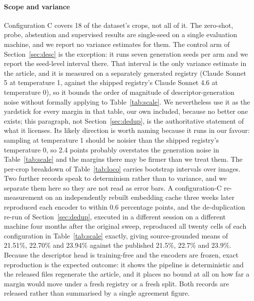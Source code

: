 \documentclass[a4paper,fleqn]{cas-dc}
\begin{document}
\paragraph{Scope and variance} Configuration C covers 18 of the dataset's crops, not all of it. %
The zero-shot, probe, abstention and supervised results are
single-seed on a single evaluation machine, and we report no variance estimates for them.
The control arm of Section~\ref{sec:desc} is the exception: it runs seven generation
seeds per arm and we report the seed-level interval there. That interval is the only variance estimate in the article, and it is measured on a separately generated registry (Claude Sonnet 5 at temperature 1, against the shipped registry's Claude Sonnet 4.6 at temperature 0), so it bounds the order of magnitude of descriptor-generation noise without formally applying to Table~\ref{tab:scale}. We nevertheless use it as the yardstick for every margin in that table, our own included, because no better one exists; this paragraph, not Section~\ref{sec:dedup}, is the authoritative statement of what it licenses. Its likely direction is worth naming because it runs in our favour: sampling at temperature 1 should be noisier than the shipped registry's temperature 0, so 2.4 points probably overstates the generation noise in Table~\ref{tab:scale} and the margins there may be firmer than we treat them. The per-crop breakdown of Table~\ref{tab:loco} carries bootstrap intervals over images. Two further records speak to determinism rather than to variance, and we separate them here so they are not read as error bars. A configuration-C re-measurement on an independently rebuilt embedding cache three weeks later reproduced each encoder to within 0.6 percentage points, and the de-duplication re-run of Section~\ref{sec:dedup}, executed in a different session on a different machine four months after the original sweep, reproduced all twenty cells of each configuration in Table~\ref{tab:scale} exactly, giving source-grounded means of 21.51\%, 22.70\% and 23.94\% against the published 21.5\%, 22.7\% and 23.9\%. Because the descriptor head is training-free and the encoders are frozen, exact reproduction is the expected outcome: it shows the pipeline is deterministic and the released files regenerate the article, and it places no bound at all on how far a margin would move under a fresh registry or a fresh split. Both records are released rather than summarised by a single agreement figure.
\end{document}
